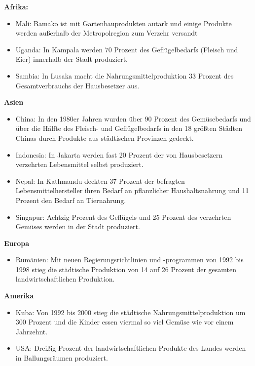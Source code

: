 \documentclass{scrartcl}
\begin{document}
\begin{displayquote}
\textbf{Afrika:}
\begin{itemize}
    \item Mali: Bamako ist mit Gartenbauprodukten autark und einige Produkte werden außerhalb der Metropolregion zum Verzehr versandt
    \item Uganda: In Kampala werden 70 Prozent des Geflügelbedarfs (Fleisch und Eier) innerhalb der Stadt produziert.
    \item Sambia: In Lusaka macht die Nahrungsmittelproduktion 33 Prozent des Gesamtverbrauchs der Hausbesetzer aus.
\end{itemize}
\textbf{Asien}
\begin{itemize}
    \item China: In den 1980er Jahren wurden über 90 Prozent des Gemüsebedarfs und über die Hälfte des Fleisch- und Geflügelbedarfs in den 18 größten Städten Chinas durch Produkte aus städtischen Provinzen gedeckt.
    \item Indonesia: In Jakarta werden fast 20 Prozent der von Hausbesetzern verzehrten Lebensmittel selbst produziert.
    \item Nepal: In Kathmandu deckten 37 Prozent der befragten Lebensmittelhersteller ihren Bedarf an pflanzlicher Haushaltsnahrung und 11 Prozent den Bedarf an Tiernahrung.
    \item Singapur: Achtzig Prozent des Geflügels und 25 Prozent des verzehrten Gemüses werden in der Stadt produziert.
\end{itemize}
\textbf{Europa}
\begin{itemize}
    \item Rumänien: Mit neuen Regierungsrichtlinien und -programmen von 1992 bis 1998 stieg die städtische Produktion von 14 auf 26 Prozent der gesamten landwirtschaftlichen Produktion.
\end{itemize}
\textbf{Amerika}
\begin{itemize}
    \item Kuba: Von 1992 bis 2000 stieg die städtische Nahrungsmittelproduktion um 300 Prozent und die Kinder essen viermal so viel Gemüse wie vor einem Jahrzehnt.
    \item USA: Dreißig Prozent der landwirtschaftlichen Produkte des Landes werden in Ballungsräumen produziert.
\end{itemize}
\end{displayquote}
\end{document}

